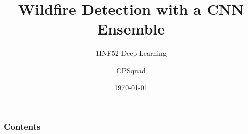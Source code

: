 \documentclass{beamer}
\title{Wildfire Detection with a CNN Ensemble}
\subtitle{1INF52 Deep Learning}
\author{CPSquad}
\institute{PUCP}
\date{\today}
\begin{document}
    \frame{\titlepage}

    \begin{frame}
    \frametitle{Contents}
    \tableofcontents
    \end{frame}

    
    
    
    
    
    
\end{document}

